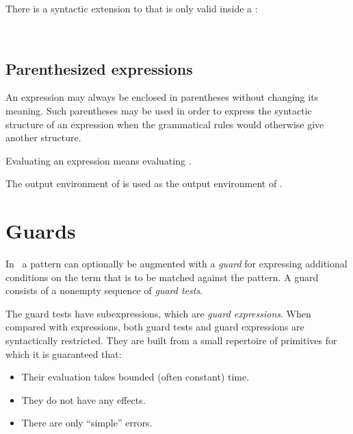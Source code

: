 \SYNTAX

\begin{rules}
       {  }
\end{rules}
There is a syntactic extension to  that is only valid inside
a :
\begin{rules}
       { \ }
\end{rules}
\fi %

\subsection{Parenthesized expressions}

\label{section:paren-expr}

An expression may always be enclosed in parentheses without changing its meaning.
Such parentheses may be used in order to express the syntactic structure
of an expression when the grammatical rules would otherwise give another
structure.  

\SYNTAX

\begin{rules}
       {\TXT{(}  \TXT{)}}
\end{rules}

\EVALUATION

Evaluating an expression  means evaluating .

\ENVIRONMENTS

The output environment of  is used as the output environment of .

\section{Guards}

\label{section:guards}

In \Erlang\ a pattern can optionally be augmented with a \emph{guard}
for expressing additional conditions on the term that is to be matched
against the pattern.  A guard consists of a nonempty sequence of
\emph{guard tests}.

The guard tests have subexpressions, which are \emph{guard
expressions}.
When compared with expressions, both guard tests and guard
expressions are syntactically restricted.
They are built from a small repertoire of primitives for which it is
guaranteed that:
\begin{itemize}
\item Their evaluation takes bounded (often constant) time.
\item They do not have any effects.
\item There are only ``simple'' errors.
\end{itemize}

